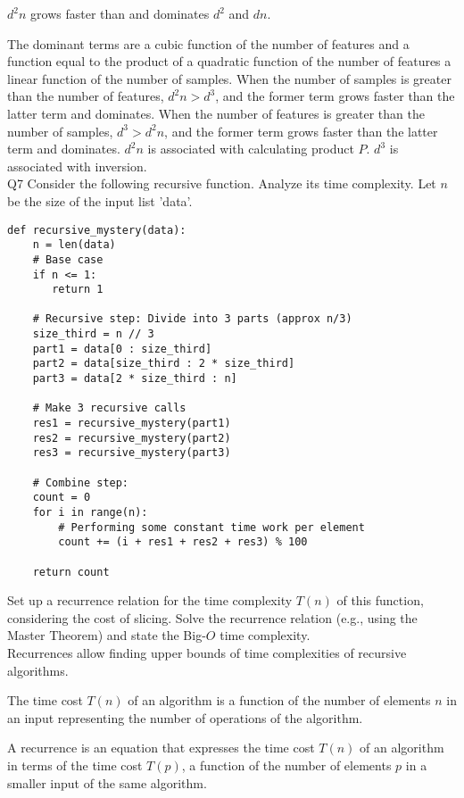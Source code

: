 \documentclass{article}
\begin{document}
$d^2 n$ grows faster than and dominates $d^2$ and $dn$.

The dominant terms are a cubic function of the number of features and a function equal to the product of a quadratic function of the number of features a linear function of the number of samples. When the number of samples is greater than the number of features, $d^2 n > d^3$, and the former term grows faster than the latter term and dominates. When the number of features is greater than the number of samples, $d^3 > d^2 n$, and the former term grows faster than the latter term and dominates. $d^2 n$ is associated with calculating product $P$. $d^3$ is associated with inversion.\\

Q7 Consider the following recursive function. Analyze its time complexity. Let $n$ be the size of the input list 'data'.

\begin{verbatim}
def recursive_mystery(data):
    n = len(data)
    # Base case
    if n <= 1:
       return 1

    # Recursive step: Divide into 3 parts (approx n/3)
    size_third = n // 3
    part1 = data[0 : size_third]
    part2 = data[size_third : 2 * size_third]
    part3 = data[2 * size_third : n]

    # Make 3 recursive calls
    res1 = recursive_mystery(part1)
    res2 = recursive_mystery(part2)
    res3 = recursive_mystery(part3)

    # Combine step:
    count = 0
    for i in range(n):
        # Performing some constant time work per element
        count += (i + res1 + res2 + res3) % 100

    return count
\end{verbatim}

Set up a recurrence relation for the time complexity $T(n)$ of this function, considering the cost of slicing. Solve the recurrence relation (e.g., using the Master Theorem) and state the Big-$O$ time complexity.\\

Recurrences allow finding upper bounds of time complexities of recursive algorithms.

The time cost $T(n)$ of an algorithm is a function of the number of elements $n$ in an input representing the number of operations of the algorithm.

A recurrence is an equation that expresses the time cost $T(n)$ of an algorithm in terms of the time cost $T(p)$, a function of the number of elements $p$ in a smaller input of the same algorithm.
\end{document}
